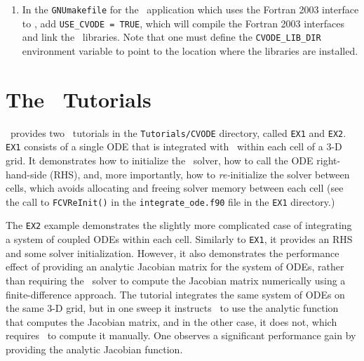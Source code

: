 \begin{enumerate}
  \item In the \texttt{GNUmakefile} for the \amrex\ application which uses the Fortran 2003 interface to \cvode, add \texttt{USE\_CVODE = TRUE}, which will compile the Fortran 2003 interfaces and link the \cvode\ libraries.
  Note that one must define the \texttt{CVODE\_LIB\_DIR} environment variable to point to the location where the libraries are installed.
\end{enumerate}


\section{The \cvode\ Tutorials}

\amrex\ provides two \cvode\ tutorials in the \texttt{Tutorials/CVODE} directory, called \texttt{EX1} and \texttt{EX2}.
\texttt{EX1} consists of a single ODE that is integrated with \cvode\ within each cell of a 3-D grid.
It demonstrates how to initialize the \cvode\ solver, how to call the ODE right-hand-side (RHS), and, more importantly, how to \emph{re-}initialize the solver between cells, which avoids allocating and freeing solver memory between each cell (see the call to \texttt{FCVReInit()} in the \texttt{integrate\_ode.f90} file in the \texttt{EX1} directory.)

The \texttt{EX2} example demonstrates the slightly more complicated case of integrating a system of coupled ODEs within each cell.
Similarly to \texttt{EX1}, it provides an RHS and some solver initialization.
However, it also demonstrates the performance effect of providing an analytic Jacobian matrix for the system of ODEs, 
rather than requiring the \cvode\ solver to compute the Jacobian matrix numerically using a finite-difference approach.
The tutorial integrates the same system of ODEs on the same 3-D grid, but in one sweep it instructs \cvode\ 
to use the analytic function that computes the Jacobian matrix, and in the other case, it does not,
which requires \cvode\ to compute it manually.
One observes a significant performance gain by providing the analytic Jacobian function.
